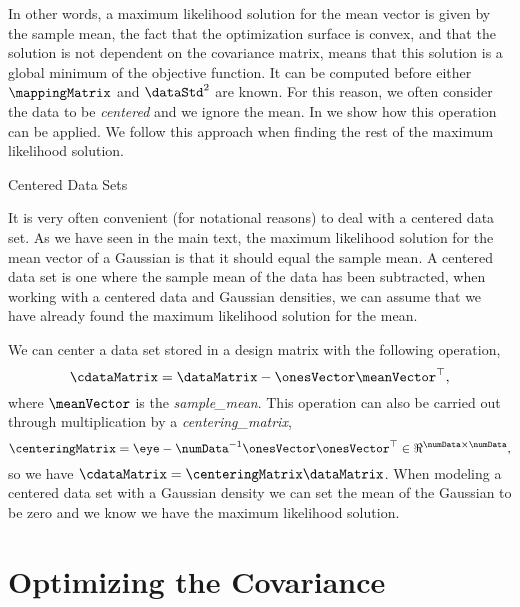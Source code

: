 In other words, a maximum likelihood solution for the mean vector is
given by the sample mean, the fact that the optimization surface is
convex, and that the solution is not dependent on the covariance
matrix, means that this solution is a global minimum of the objective
function. It can be computed before either $\mappingMatrix$ and
$\dataStd^2$ are known. For this reason, we often consider the data to
be \emph{centered} and we ignore the mean. In  we
show how this operation can be applied. We follow this approach when
finding the rest of the maximum likelihood solution.
\begin{tipfloat}
  \caption{Centered Data Sets}\label{tip:centered}

  \boxfontsize It is very often convenient (for notational reasons) to
  deal with a centered data set. As we have seen in the main text, the
  maximum likelihood solution for the mean vector of a Gaussian is
  that it should equal the sample mean. A centered data set is one
  where the sample mean of the data has been subtracted, when working
  with a centered data and Gaussian densities, we can assume that we
  have already found the maximum likelihood solution for the mean. 

  We can center a data set stored in a design matrix with the
  following operation,
  \[
  \cdataMatrix = \dataMatrix - \onesVector \meanVector^\top,
  \]
  where $\meanVector$ is the \emph{\gls{sample_mean}}. This
  operation can also be carried out through multiplication by a
  \emph{\gls{centering_matrix}},
  \[
  \centeringMatrix=\eye-\numData^{-1}\onesVector\onesVector^{\top}\in\Re^{\numData\times\numData},
  \]
  so we have $\cdataMatrix = \centeringMatrix \dataMatrix$. When
  modeling a centered data set with a Gaussian density we can set the
  mean of the Gaussian to be zero and we know we have the maximum
  likelihood solution.
\end{tipfloat}

\section{Optimizing the Covariance}

